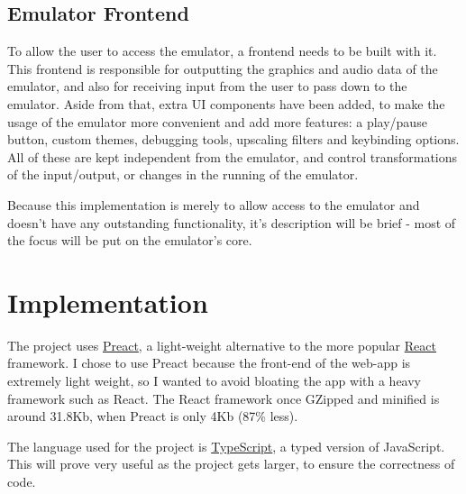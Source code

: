 \documentclass[11pt]{report}
\begin{document}
\section{Emulator Frontend}

To allow the user to access the emulator, a frontend needs to be built with it. This frontend is responsible for outputting the graphics and audio data of the emulator, and also for receiving input from the user to pass down to the emulator. Aside from that, extra UI components have been added, to make the usage of the emulator more convenient and add more features: a play/pause button, custom themes, debugging tools, upscaling filters and keybinding options. All of these are kept independent from the emulator, and control transformations of the input/output, or changes in the running of the emulator.

Because this implementation is merely to allow access to the emulator and doesn't have any outstanding functionality, it's description will be brief - most of the focus will be put on the emulator's core.

\chapter{Implementation}

The project uses \href{https://preactjs.com/}{Preact}, a light-weight alternative to the more popular \href{https://reactjs.org/}{React} framework. I chose to use Preact because the front-end of the web-app is extremely light weight, so I wanted to avoid bloating the app with a heavy framework such as React. The React framework once GZipped and minified is around 31.8Kb, when Preact is only 4Kb (87\% less).

The language used for the project is \href{https://www.typescriptlang.org/}{TypeScript}, a typed version of JavaScript. This will prove very useful as the project gets larger, to ensure the correctness of code.
\end{document}
